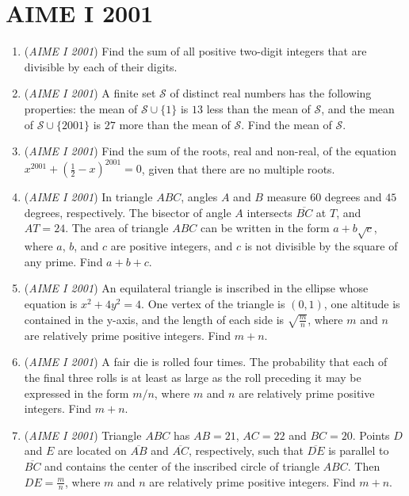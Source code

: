 \section{AIME I 2001}
        \begin{enumerate}
        	\item (\textit{AIME I 2001}) Find the sum of all positive two-digit integers that are divisible by each of their digits.


 

	\item (\textit{AIME I 2001}) A finite set $\mathcal{S}$ of distinct real numbers has the following properties: the mean of $\mathcal{S}\cup\{1\}$ is $13$ less than the mean of $\mathcal{S}$, and the mean of $\mathcal{S}\cup\{2001\}$ is $27$ more than the mean of $\mathcal{S}$. Find the mean of $\mathcal{S}$.


 

	\item (\textit{AIME I 2001}) Find the sum of the roots, real and non-real, of the equation $x^{2001}+\left(\frac 12-x\right)^{2001}=0$, given that there are no multiple roots.


 

	\item (\textit{AIME I 2001}) In triangle $ABC$, angles $A$ and $B$ measure $60$ degrees and $45$ degrees, respectively. The bisector of angle $A$ intersects $\overline{BC}$ at $T$, and $AT=24$. The area of triangle $ABC$ can be written in the form $a+b\sqrt{c}$, where $a$, $b$, and $c$ are positive integers, and $c$ is not divisible by the square of any prime. Find $a+b+c$.


 

	\item (\textit{AIME I 2001}) An equilateral triangle is inscribed in the ellipse whose equation is $x^2+4y^2=4$. One vertex of the triangle is $(0,1)$, one altitude is contained in the y-axis, and the length of each side is $\sqrt{\frac mn}$, where $m$ and $n$ are relatively prime positive integers. Find $m+n$.


 

	\item (\textit{AIME I 2001}) A fair die is rolled four times. The probability that each of the final three rolls is at least as large as the roll preceding it may be expressed in the form $m/n$, where $m$ and $n$ are relatively prime positive integers. Find $m+n$.


 

	\item (\textit{AIME I 2001}) Triangle $ABC$ has $AB=21$, $AC=22$ and $BC=20$. Points $D$ and $E$ are located on $\overline{AB}$ and $\overline{AC}$, respectively, such that $\overline{DE}$ is parallel to $\overline{BC}$ and contains the center of the inscribed circle of triangle $ABC$. Then $DE=\frac{m}{n}$, where $m$ and $n$ are relatively prime positive integers. Find $m+n$.



\end{enumerate}
